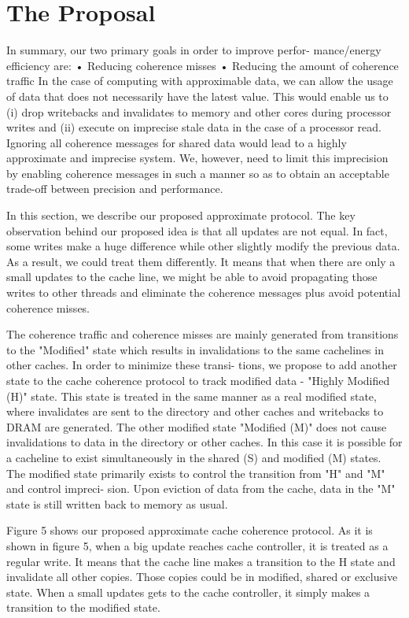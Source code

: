 \section{The Proposal}


In summary, our two primary goals in order to improve perfor- mance/energy efficiency are:
• Reducing coherence misses
• Reducing the amount of coherence traffic
In the case of computing with approximable data, we can allow the usage of data that does not necessarily have the latest value. This would enable us to (i) drop writebacks and invalidates to memory and other cores during processor writes and (ii) execute on imprecise stale data in the case of a processor read.
Ignoring all coherence messages for shared data would lead to a highly approximate and imprecise system. We, however, need to limit this imprecision by enabling coherence messages in such a manner so as to obtain an acceptable trade-off between precision and performance.

In this section, we describe our proposed approximate protocol. The key observation behind our proposed idea is that all updates are not equal. In fact, some writes make a huge difference while other slightly modify the previous data. As a result, we could treat them differently. It means that when there are only a small updates to the cache line, we might be able to avoid propagating those writes to other threads and eliminate the coherence messages plus avoid potential coherence misses.

The coherence traffic and coherence misses are mainly generated from transitions to the "Modified" state which results in invalidations to the same cachelines in other caches. In order to minimize these transi- tions, we propose to add another state to the cache coherence protocol to track modified data - "Highly Modified (H)" state. This state is treated in the same manner as a real modified state, where invalidates are sent to the directory and other caches and writebacks to DRAM are generated. The other modified state "Modified (M)" does not cause invalidations to data in the directory or other caches. In this case it is possible for a cacheline to exist simultaneously in the shared (S) and modified (M) states. The modified state primarily exists to control the transition from "H" and "M" and control impreci- sion. Upon eviction of data from the cache, data in the "M" state is still written back to memory as usual.

Figure 5 shows our proposed approximate cache coherence protocol. As it is shown in figure 5, when a big update reaches cache controller, it is treated as a regular write. It means that the cache line makes a transition to the H state and invalidate all other copies. Those copies could be in modified, shared or exclusive state. When a small updates gets to the cache controller, it simply makes a transition to the modified state.  




